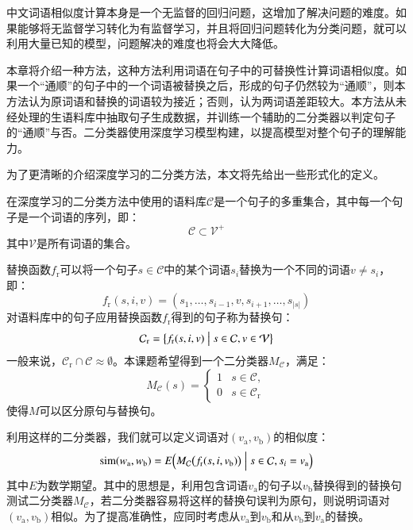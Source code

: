 
\label{c:classifer}
中文词语相似度计算本身是一个无监督的回归问题，这增加了解决问题的难度。如果能够将无监督学习转化为有监督学习，并且将回归问题转化为分类问题，就可以利用大量已知的模型，问题解决的难度也将会大大降低。

本章将介绍一种方法，这种方法利用词语在句子中的可替换性计算词语相似度。如果一个“通顺”的句子中的一个词语被替换之后，形成的句子仍然较为“通顺”，则本方法认为原词语和替换的词语较为接近；否则，认为两词语差距较大。本方法从未经处理的生语料库中抽取句子生成数据，并训练一个辅助的二分类器以判定句子的“通顺”与否。二分类器使用深度学习模型构建，以提高模型对整个句子的理解能力。

\label{s:classifer pricinple}
为了更清晰的介绍深度学习的二分类方法，本文将先给出一些形式化的定义。

在深度学习的二分类方法中使用的语料库$\mathcal{C}$是一个句子的多重集合，其中每一个句子是一个词语的序列，即：
\begin{equation}
\mathcal{C} \subset \mathcal{V}^+
\label{e:corpus}
\end{equation}
其中$\mathcal{V}$是所有词语的集合。

替换函数$f_\text{r}$可以将一个句子$s \in \mathcal{C}$中的某个词语$s_i$替换为一个不同的词语$v \ne s_i$，即：
\begin{equation}
f_\text{r}(s, i, v) = (s_1, \dots, s_{i - 1}, v, s_{i + 1}, \dots, s_{|s|})
\end{equation}
对语料库中的句子应用替换函数$f_\text{r}$得到的句子称为替换句：
\begin{equation}
\mathcal{C}_\text{r} = \bigl\{f_\text{r}(s, i, v) \bigm| s \in \mathcal{C}, v \in \mathcal{V}\bigr\}
\end{equation}
一般来说，$\mathcal{C}_\text{r} \cap \mathcal{C} \approx \emptyset$。本课题希望得到一个二分类器$M_\mathcal{C}$，满足：
\begin{equation}
M_\mathcal{C}(s) = 
\begin{cases}
1 & s \in \mathcal{C}, \\
0 & s \in \mathcal{C}_\text{r}
\end{cases}
\end{equation}
使得$M$可以区分原句与替换句。

利用这样的二分类器，我们就可以定义词语对$(v_\text{a}, v_\text{b})$的相似度：
\begin{equation}
\operatorname{sim}(w_\text{a}, w_\text{b}) = E\Bigl(M_\mathcal{C}\bigl(f_\text{r}(s, i, v_\text{b})\bigr) \Bigm| s \in \mathcal{C}, s_i = v_\text{a}\Bigr)
\end{equation}
其中$E$为数学期望。其中的思想是，利用包含词语$v_\text{a}$的句子以$v_\text{b}$替换得到的替换句测试二分类器$M_\mathcal{C}$，若二分类器容易将这样的替换句误判为原句，则说明词语对$(v_\text{a}, v_\text{b})$相似。为了提高准确性，应同时考虑从$v_\text{a}$到$v_\text{b}$和从$v_\text{b}$到$v_\text{a}$的替换。

